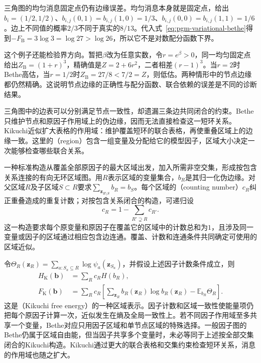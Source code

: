 三角图的均匀消息固定点仍有边缘误差。均匀消息本身就是固定点，给出$b_i=(1/2,1/2)$、$b_{i,j}(0,1)=b_{i,j}(1,0)=1/3$、$b_{i,j}(0,0)=b_{i,j}(1,1)=1/6$。边上不同值的概率$2/3$不同于真实的$8/13$。代入式~\eqref{eq:pgm-variational-bethe}得到$-F_{\mathrm B}=3\log3=\log27>\log26$，所以它不是对数配分函数下界。

这个例子还能检验界方向。暂把$\beta$改为任意实数，令$r=e^\beta>0$，同一均匀固定点给出$Z_{\mathrm B}=(1+r)^3$，精确值是$Z=2+6r^2$，二者相差$(r-1)^3$。当$r=2$时Bethe高估，当$r=1/2$时$Z_{\mathrm B}=27/8<7/2=Z$，则低估。两种情形中的节点边缘都仍然精确。这说明节点边缘的正确性与配分函数、联合依赖的误差是不同的诊断结果。

\label{sec:pgm-variational-kikuchi}

三角图中的边表可以分别满足节点一致性，却遗漏三条边共同闭合的约束。Bethe只维护节点和原因子作用域上的伪边缘，因而无法直接检查这一短环关系。Kikuchi近似扩大表格的作用域：维护覆盖短环的联合表格，再使重叠区域上的边缘一致。这里的（region）包含一组变量及分配给它的模型因子，区域大小决定一次能够检查哪些联合关系。

一种标准构造从覆盖全部原因子的最大区域出发，加入所需非空交集，形成按包含关系连接的有向无环区域图。用$R$表示区域的变量集合，$b_R$是其归一化伪边缘。对父区域$R$及子区域$S\subset R$要求$\sum_{\bm z_{R\setminus S}}b_R=b_S$。每个区域的（counting number）$c_R$纠正重叠造成的重复计数；对按包含关系闭合的构造，可递归设
\begin{equation}
  c_R=1-\sum_{R'\supsetneq R}c_{R'}.
  \label{eq:pgm-variational-counting}
\end{equation}
这一构造要求每个原变量和原因子在覆盖它的区域中的计数总和为$1$，且涉及同一变量或因子的区域通过相应包含边连通。覆盖、计数和连通条件共同确定可使用的区域近似。

令$\Theta_R(\bm z_R)=\sum_{a:S_a\subseteq R}\log\psi_a(\bm z_{S_a})$，并假设上述因子计数条件成立，则
\begin{equation}
  \begin{aligned}
    H_{\mathrm K}(\bm b)&=\sum_R c_R H(b_R),\\
    F_{\mathrm K}(\bm b)
      &=\sum_R c_R\left[
          \sum_{\bm z_R}b_R(\bm z_R)\log b_R(\bm z_R)
          -\mathbb E_{b_R}\Theta_R\right].
  \end{aligned}
  \label{eq:pgm-variational-kikuchi}
\end{equation}
这是（Kikuchi free energy）的一种区域表示。因子计数和区域一致性使能量项仍把每个原因子计算一次，近似发生在熵及全局一致性上。若不同因子作用域至多共享一个变量，Bethe对应只用因子区域和单节点区域的特殊选择。一般因子图的Bethe仍属于区域自由能，但当因子共享多个变量时，未必等同于上述按全部交集闭合的Kikuchi构造。Kikuchi通过更大的联合表格和交集约束检查短环关系，消息的作用域也随之扩大。

